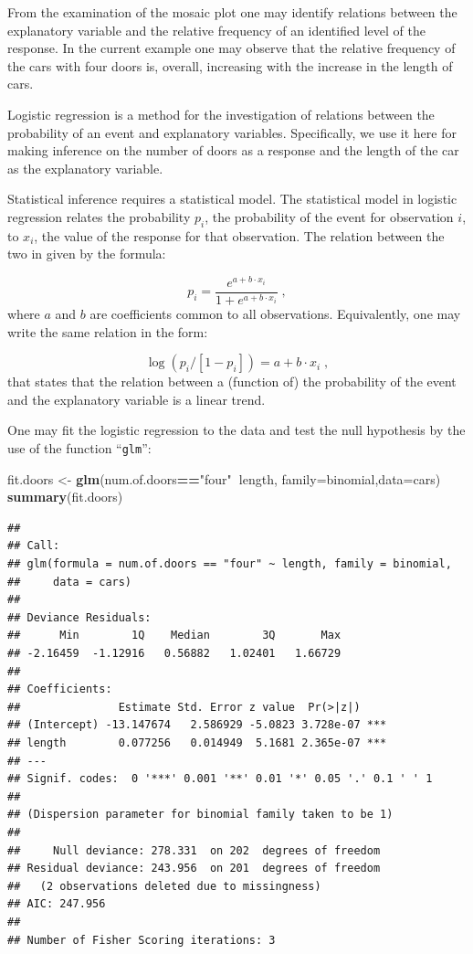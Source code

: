 \documentclass[]{krantz}
\makeatletter
\newenvironment{Shaded}{\begin{snugshade}}{\end{snugshade}}
\newcommand{\KeywordTok}[1]{\textcolor[rgb]{0.13,0.29,0.53}{\textbf{#1}}}
\newcommand{\DataTypeTok}[1]{\textcolor[rgb]{0.13,0.29,0.53}{#1}}
\newcommand{\StringTok}[1]{\textcolor[rgb]{0.31,0.60,0.02}{#1}}
\newcommand{\OperatorTok}[1]{\textcolor[rgb]{0.81,0.36,0.00}{\textbf{#1}}}
\newcommand{\NormalTok}[1]{#1}
\newenvironment{kframe}{%
\medskip{}
\setlength{\fboxsep}{.8em}
 \def\at@end@of@kframe{}%
 \ifinner\ifhmode%
  \def\at@end@of@kframe{\end{minipage}}%
  \begin{minipage}{\columnwidth}%
 \fi\fi%
 \def\FrameCommand##1{\hskip\@totalleftmargin \hskip-\fboxsep
 \colorbox{shadecolor}{##1}\hskip-\fboxsep
     \hskip-\linewidth \hskip-\@totalleftmargin \hskip\columnwidth}%
 \MakeFramed {\advance\hsize-\width
   \@totalleftmargin\z@ \linewidth\hsize
   \@setminipage}}%
 {\par\unskip\endMakeFramed%
 \at@end@of@kframe}
\renewenvironment{Shaded}{\begin{kframe}}{\end{kframe}}
\theoremstyle{definition}
\theoremstyle{definition}
\theoremstyle{definition}
\theoremstyle{remark}
\makeatother
\begin{document}
From the examination of the mosaic plot one may identify relations
between the explanatory variable and the relative frequency of an
identified level of the response. In the current example one may observe
that the relative frequency of the cars with four doors is, overall,
increasing with the increase in the length of cars.

Logistic regression is a method for the investigation of relations
between the probability of an event and explanatory variables.
Specifically, we use it here for making inference on the number of doors
as a response and the length of the car as the explanatory variable.

Statistical inference requires a statistical model. The statistical
model in logistic regression relates the probability \(p_i\), the
probability of the event for observation \(i\), to \(x_i\), the value of
the response for that observation. The relation between the two in given
by the formula:

\[p_i = \frac{e^{a + b \cdot x_i}}{1 + e^{a + b\cdot x_i}}\;,\] where
\(a\) and \(b\) are coefficients common to all observations.
Equivalently, one may write the same relation in the form:

\[\log(p_i/[1-p_i]) = a + b\cdot x_i\;,\] that states that the relation
between a (function of) the probability of the event and the explanatory
variable is a linear trend.

One may fit the logistic regression to the data and test the null
hypothesis by the use of the function ``\texttt{glm}'':

\begin{Shaded}
\begin{Highlighting}[]
\NormalTok{fit.doors <-}\StringTok{ }\KeywordTok{glm}\NormalTok{(num.of.doors}\OperatorTok{==}\StringTok{"four"}\OperatorTok{~}\NormalTok{length, }\DataTypeTok{family=}\NormalTok{binomial,}\DataTypeTok{data=}\NormalTok{cars)}
\KeywordTok{summary}\NormalTok{(fit.doors)}
\end{Highlighting}
\end{Shaded}

\begin{verbatim}
## 
## Call:
## glm(formula = num.of.doors == "four" ~ length, family = binomial, 
##     data = cars)
## 
## Deviance Residuals: 
##      Min        1Q    Median        3Q       Max  
## -2.16459  -1.12916   0.56882   1.02401   1.66729  
## 
## Coefficients:
##               Estimate Std. Error z value  Pr(>|z|)    
## (Intercept) -13.147674   2.586929 -5.0823 3.728e-07 ***
## length        0.077256   0.014949  5.1681 2.365e-07 ***
## ---
## Signif. codes:  0 '***' 0.001 '**' 0.01 '*' 0.05 '.' 0.1 ' ' 1
## 
## (Dispersion parameter for binomial family taken to be 1)
## 
##     Null deviance: 278.331  on 202  degrees of freedom
## Residual deviance: 243.956  on 201  degrees of freedom
##   (2 observations deleted due to missingness)
## AIC: 247.956
## 
## Number of Fisher Scoring iterations: 3
\end{verbatim}
\end{document}
